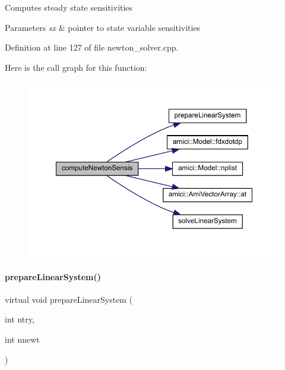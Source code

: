 Computes steady state sensitivities


\begin{DoxyParams}{Parameters}
{\em sx} & pointer to state variable sensitivities\\
\hline
\end{DoxyParams}


Definition at line 127 of file newton\+\_\+solver.\+cpp.

Here is the call graph for this function\+:
\nopagebreak
\begin{figure}[H]
\begin{center}
\leavevmode
\includegraphics[width=350pt]{classamici_1_1_newton_solver_a90d4823c7b8373d9aaccba80c930a7c7_cgraph}
\end{center}
\end{figure}
\mbox{\label{classamici_1_1_newton_solver_a4aed46b0343374f171f9b4b51fa009e7}} 
\paragraph{\texorpdfstring{prepare\+Linear\+System()}{prepareLinearSystem()}}
{\footnotesize\ttfamily virtual void prepare\+Linear\+System (\begin{DoxyParamCaption}\item[{int}]{ntry,  }\item[{int}]{nnewt }\end{DoxyParamCaption})\hspace{0.3cm}{\ttfamily [pure virtual]}}

